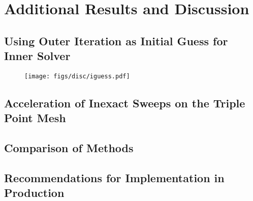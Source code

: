 \documentclass[../doc.tex]{subfiles}
\begin{document}
\chapter{Additional Results and Discussion}
\section{Using Outer Iteration as Initial Guess for Inner Solver}
\begin{figure}
\centering
\texttt{[image: figs/disc/iguess.pdf]}
\caption{}
\label{disc:iguess}
\end{figure}

\begin{table}
\centering
\caption{}
\label{}

\end{table}

\section{Acceleration of Inexact Sweeps on the Triple Point Mesh}

\begin{table}
\centering
\caption{}
\label{disc:mult_sweeps}

\end{table}

\begin{table}
\centering
\caption{}
\label{disc:anderson}

\end{table}

\section{Comparison of Methods}

\section{Recommendations for Implementation in Production}
\end{document}
